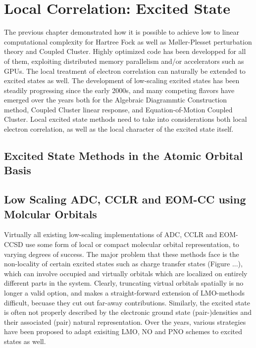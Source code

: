 \chapter{Local Correlation: Excited State}

The previous chapter demonstrated how it is possible to achieve low to linear computational complexity for Hartree Fock as well as M{\o}ller-Plesset perturbation theory and Coupled Cluster. Highly optimized code has been developped for all of them, exploiting distributed memory parallelism and/or accelerators such as GPUs. The local treatment of electron correlation can naturally be extended to excited states as well. The development of low-scaling excited states has been steadily progressing since the early 2000s, and many competing flavors have emerged over the years both for the Algebraic Diagrammtic Construction method, Coupled Cluster linear response, and Equation-of-Motion Coupled Cluster. Local excited state methods need to take into considerations both local electron correlation, as well as the local character of the excited state itself.


\section{Excited State Methods in the Atomic Orbital Basis}


\section{Low Scaling ADC, CCLR and EOM-CC using Molcular Orbitals}

Virtually all existing low-scaling implementations of ADC, CCLR and EOM-CCSD use some form of local or compact molecular orbital representation, to varying degrees of success. The major problem that these methods face is the non-locality of certain excited states such as charge transfer states (Figure ...), which can involve occupied and virtually orbitals which are localized on entirely different parts in the system. Clearly, truncating virtual orbitals spatially is no longer a valid option, and makes a straight-forward extension of LMO-methods difficult, becuase they cut out far-away contributions. Similarly, the excited state is often not properly described by the electronic ground state (pair-)densities and their associated (pair) natural representation. Over the years, various strategies have been proposed to adapt exisiting LMO, NO and PNO schemes to excited states as well. 

